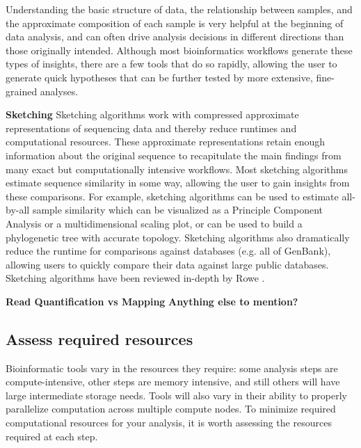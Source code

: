 \documentclass[10pt,letterpaper]{article}
\begin{document}
Understanding the basic structure of data, the relationship between samples, and the approximate composition of each sample is very helpful at the beginning of data analysis, and can often drive analysis decisions in different directions than those originally intended. Although most bioinformatics workflows generate these types of insights, there are a few tools that do so rapidly, allowing the user to generate quick hypotheses that can be further tested by more extensive, fine-grained analyses. 

\textbf{Sketching} Sketching algorithms work with compressed approximate representations of sequencing data and thereby reduce runtimes and computational resources. These approximate representations retain enough information about the original sequence to recapitulate the main findings from many exact but computationally intensive workflows. Most sketching algorithms estimate sequence similarity in some way, allowing the user to gain insights from these comparisons. For example, sketching algorithms can be used to estimate all-by-all sample similarity which can be visualized as a Principle Component Analysis or a multidimensional scaling plot, or can be used to build a phylogenetic tree with accurate topology. Sketching algorithms also dramatically reduce the runtime for comparisons against databases (e.g. all of GenBank), allowing users to quickly compare their data against large public databases. Sketching algorithms have been reviewed in-depth by Rowe \cite{rowe2019streaming}.

\textbf{Read Quantification vs Mapping}
\textbf{Anything else to mention?}


\subsection*{Assess required resources}

Bioinformatic tools vary in the resources they require: some analysis steps are compute-intensive, other steps are memory intensive, and still others will have large intermediate storage needs. Tools will also vary in their ability to properly parallelize computation across multiple compute nodes. To minimize required computational resources for your analysis, it is worth assessing the resources required at each step.
\end{document}

